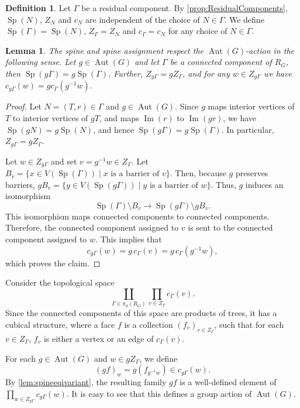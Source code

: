 \documentclass[reqno,dvipsnames]{amsart}
\theoremstyle{plain}
\newtheorem{lemma}[theorem]{Lemma}
\numberwithin{equation}{section}
\theoremstyle{definition}
\newtheorem{definition}[theorem]{Definition}
\DeclareMathOperator{\Image}{Im}
\DeclareMathOperator{\Sp}{Sp}
\DeclareMathOperator{\Aut}{Aut}
\begin{document}
\begin{definition}
	Let $\Gamma$ be a residual component. By \autoref{prop:ResidualComponents}, $\Sp(N)$, $Z_N$ and $c_N$ are independent of the choice of $N\in \Gamma$. We define $\Sp(\Gamma) = \Sp(N)$, $Z_\Gamma = Z_N$ and $c_\Gamma = c_N$ for any choice of $N\in \Gamma$.
\end{definition}

\begin{lemma}\label{lem:spineeqivariant}
	The spine and spine assignment respect the $\Aut(G)$-action in the following sense. Let $g\in \Aut(G)$ and let $\Gamma$ be a connected component of $R_G$, then $\Sp(g\Gamma)= g\Sp(\Gamma)$. Further, $Z_{g\Gamma} = gZ_\Gamma$, and for any $w\in Z_{g\Gamma}$ we have $c_{g\Gamma}(w) = g c_{\Gamma}(g^{-1}w)$.
\end{lemma}

\begin{proof}
	Let $N = (T,r)\in \Gamma$ and $g\in \Aut(G)$. Since $g$ maps interior vertices of $T$ to interior vertices of $gT$, and maps $\Image(r)$ to $\Image(gr)$, we have $\Sp(gN)=g\Sp(N)$, and hence $\Sp(g\Gamma)=g\Sp(\Gamma)$. In particular, $Z_{g\Gamma} = gZ_\Gamma$.
	
	Let $w\in Z_{g\Gamma}$ and set $v=g^{-1}w\in Z_\Gamma$. Let $B_v=\{x\in V(\Sp(\Gamma)) \mid x \text{ is a barrier of } v\}$. Then, because $g$ preserves barriers, $gB_v = \{y\in V(\Sp(g\Gamma)) \mid y \text{ is a barrier of } w\}$. Thus, $g$ induces an isomorphism
	\[
	\Sp(\Gamma)\setminus B_v
	\to
	\Sp(g\Gamma)\setminus gB_v.
	\]
	This isomorphism maps connected components to connected components. Therefore, the connected component assigned to $v$ is sent to the connected component assigned to $w$. This implies that 
	\[
	c_{g\Gamma}(w)=g\,c_\Gamma(v)=g\,c_\Gamma(g^{-1}w),
	\]
	which proves the claim.
\end{proof}

Consider the topological space 
\[
\coprod_{\Gamma\in \pi_0(R_G)}\prod_{v\in Z_\Gamma} c_\Gamma(v).
\]
Since the connected components of this space are products of trees, it has a cubical structure, where a face $f$ is a collection $(f_v)_{v\in Z_\Gamma}$, such that for each $v\in Z_\Gamma$, $f_v$ is either a vertex or an edge of $c_\Gamma(v)$. 

For each $g\in \Aut (G)$ and $w\in gZ_\Gamma$, we define
\[
(gf)_{w} = g(f_{g^{-1}w})\in c_{g\Gamma}(w).
\]
By \autoref{lem:spineeqivariant}, the resulting family $gf$ is a well-defined element of $\prod_{w\in Z_{g\Gamma}}c_{g\Gamma}(w)$. It is easy to see that this defines a group action of $\Aut(G)$.
\end{document}
